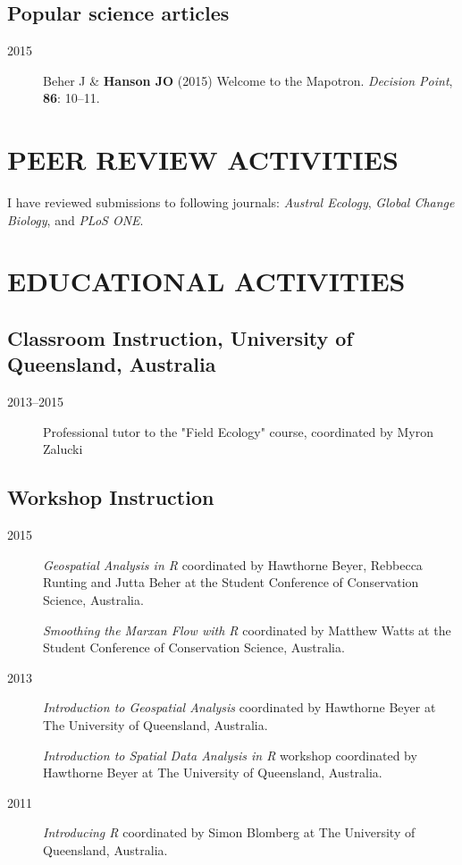 \documentclass[12pt,a4paper]{article}
\begin{document}
\subsection*{Popular science articles}
\begin{description}

\item[2015] Beher J \& \textbf{Hanson JO} (2015) Welcome to the Mapotron. \textit{Decision Point}, \textbf{86}: 10--11.

\end{description}

\section*{PEER REVIEW ACTIVITIES}

I have reviewed submissions to following journals: \textit{Austral Ecology},   \textit{Global Change Biology}, and \textit{PLoS ONE}.

\section*{EDUCATIONAL ACTIVITIES}

\subsection*{Classroom Instruction, University of Queensland, Australia}
\begin{description}

\item[2013--2015] Professional tutor to the "Field Ecology" course, coordinated by Myron Zalucki

\end{description}

\subsection*{Workshop Instruction}
\begin{description}

\item[2015] \textit{Geospatial Analysis in R} coordinated by Hawthorne Beyer, Rebbecca Runting and Jutta Beher at the Student Conference of Conservation Science, Australia.

\item[] \textit{Smoothing the Marxan Flow with R} coordinated by Matthew Watts at the Student Conference of Conservation Science, Australia.

\item[2013] \textit{Introduction to Geospatial Analysis} coordinated by Hawthorne Beyer at The University of Queensland, Australia.

\item[] \textit{Introduction to Spatial Data Analysis in R} workshop coordinated by Hawthorne Beyer at The University of Queensland, Australia.

\item[2011] \textit{Introducing R} coordinated by Simon Blomberg at The University of Queensland, Australia.

\end{description}
\end{document}
